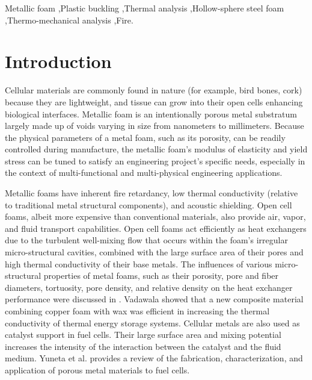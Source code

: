 \documentclass[review]{elsarticle}
\begin{document}
\begin{frontmatter}
\begin{keyword}
Metallic foam \sep Plastic buckling \sep Thermal analysis \sep Hollow-sphere steel foam \sep Thermo-mechanical analysis \sep Fire.
\end{keyword}

\end{frontmatter}

\linenumbers

\section{Introduction}

Cellular materials are commonly found in nature (for example, bird bones, cork) because they are lightweight, and tissue can grow into their open cells enhancing biological interfaces. Metallic foam is an intentionally porous metal substratum largely made up of voids varying in size from nanometers to millimeters. Because the physical parameters of a metal foam, such as its porosity, can be readily controlled during manufacture, the metallic foam's modulus of elasticity and yield stress can be tuned to satisfy an engineering project's specific needs, especially in the context of multi-functional and multi-physical engineering applications.

Metallic foams have inherent fire retardancy, low thermal conductivity (relative to traditional metal structural components), and acoustic shielding. Open cell foams, albeit more expensive than conventional materials, also provide air, vapor, and fluid transport capabilities. Open cell foams act efficiently as heat exchangers due to the turbulent well-mixing flow that occurs within the foam's irregular micro-structural cavities, combined with the large surface area of their pores and high thermal conductivity of their base metals. The influences of various micro-structural properties of metal foams, such as their porosity, pore and fiber diameters, tortuosity, pore density, and relative density on the heat exchanger performance were discussed in \cite{MahjoobKambiz2008}. Vadawala \cite{Vadwala2011} showed that a new composite material combining copper foam with wax was efficient in increasing the thermal conductivity of thermal energy storage systems. Cellular metals are also used as catalyst support in fuel cells. Their large surface area and mixing potential increases the intensity of the interaction between the catalyst and the fluid medium. Yuneta et al. \cite{Yuanetal2012} provides a review of the fabrication, characterization, and application of porous metal materials to fuel cells.
\end{document}
